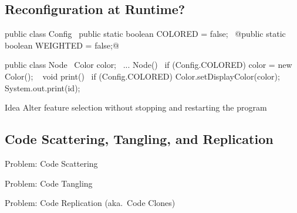 \subsection{Reconfiguration at Runtime?}
\begin{frame}[fragile]{\myframetitle}
	\begin{mycolumns}[widths={45}]
		\small
\begin{codetight}{}
public class Config {
	~public static boolean COLORED = false;~
	@public static boolean WEIGHTED = false;@
}

\end{codetight}
\begin{codetight}{}
public class Node {
	~Color color;~
	...
	Node(){
		~if (Config.COLORED) {
			color = new Color();
		}~
	}
	void print() {
		~if (Config.COLORED) {
			Color.setDisplayColor(color);
		}~
		System.out.print(id);
	}
}
\end{codetight}
	\mynextcolumn
		\begin{definition}{Idea}
			Alter feature selection without stopping and restarting the program
		\end{definition}
	\end{mycolumns}
\end{frame}


\subsection{Code Scattering, Tangling, and Replication}
\begin{frame}{Problem: Code Scattering }
	\centering{}
\end{frame}

\begin{frame}{Problem: Code Tangling }
	\centering{}
\end{frame}

\begin{frame}{Problem: Code Replication (aka.\ Code Clones)}
	\centering{}
\end{frame}
